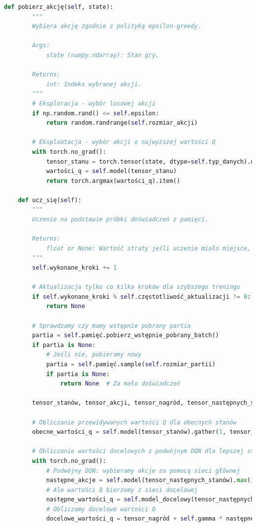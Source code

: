 \documentclass[a4paper,12pt]{article}
\begin{document}
\begin{lstlisting}[language=Python]
    def pobierz_akcję(self, state):
        """
        Wybiera akcję zgodnie z polityką epsilon-greedy.
        
        Args:
            state (numpy.ndarray): Stan gry.
            
        Returns:
            int: Indeks wybranej akcji.
        """
        # Eksploracja - wybór losowej akcji
        if np.random.rand() <= self.epsilon:
            return random.randrange(self.rozmiar_akcji)
        
        # Eksploatacja - wybór akcji o najwyższej wartości Q
        with torch.no_grad():
            tensor_stanu = torch.tensor(state, dtype=self.typ_danych).unsqueeze(0).to(self.device)
            wartości_q = self.model(tensor_stanu)
            return torch.argmax(wartości_q).item()
    
    def ucz_się(self):
        """
        Uczenie na podstawie próbki doświadczeń z pamięci.
        
        Returns:
            float or None: Wartość straty jeśli uczenie miało miejsce, None w przeciwnym razie.
        """
        self.wykonane_kroki += 1
        
        # Aktualizacja tylko co kilka kroków dla szybszego treningu
        if self.wykonane_kroki % self.częstotliwość_aktualizacji != 0:
            return None
        
        # Sprawdzamy czy mamy wstępnie pobrany partia
        partia = self.pamięć.pobierz_wstępnie_pobrany_batch()
        if partia is None:
            # Jeśli nie, pobieramy nowy
            partia = self.pamięć.sample(self.rozmiar_partii)
            if partia is None:
                return None  # Za mało doświadczeń
        
        tensor_stanów, tensor_akcji, tensor_nagród, tensor_następnych_stanów, tensor_zakończonych = partia
        
        # Obliczanie przewidywanych wartości Q dla obecnych stanów
        obecne_wartości_q = self.model(tensor_stanów).gather(1, tensor_akcji.unsqueeze(1)).squeeze(1)
        
        # Obliczanie wartości docelowych z podwójnym DQN dla lepszej stabilności
        with torch.no_grad():
            # Podwójny DQN: wybieramy akcje za pomocą sieci głównej
            następne_akcje = self.model(tensor_następnych_stanów).max(1)[1].unsqueeze(1)
            # Ale wartości Q bierzemy z sieci docelowej
            następne_wartości_q = self.model_docelowy(tensor_następnych_stanów).gather(1, następne_akcje).squeeze(1)
            # Obliczamy docelowe wartości Q
            docelowe_wartości_q = tensor_nagród + self.gamma * następne_wartości_q * (~tensor_zakończonych)
        

\end{lstlisting}
\end{document}
